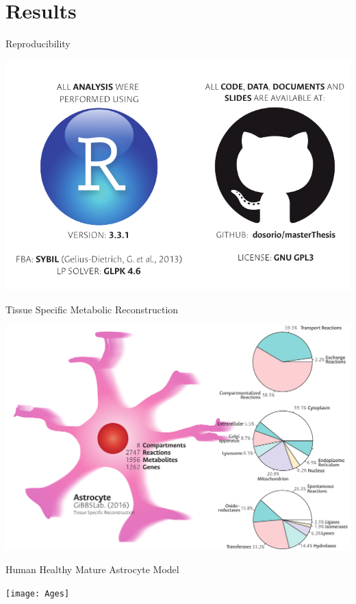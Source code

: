 \documentclass[11pt]{beamer}
\begin{document}
\section{Results}
\begin{frame}{Reproducibility}
\begin{center}
\includegraphics[width=\textwidth]{Materials}
\end{center}
\end{frame}
\begin{frame}{Tissue Specific Metabolic Reconstruction}
\begin{center}
\includegraphics[width=\textwidth]{Astrocyte}
\end{center}
\end{frame}
\begin{frame}{Human Healthy Mature Astrocyte Model}
\begin{center}
\texttt{[image: Ages]}
\end{center}
\end{frame}
\end{document}
